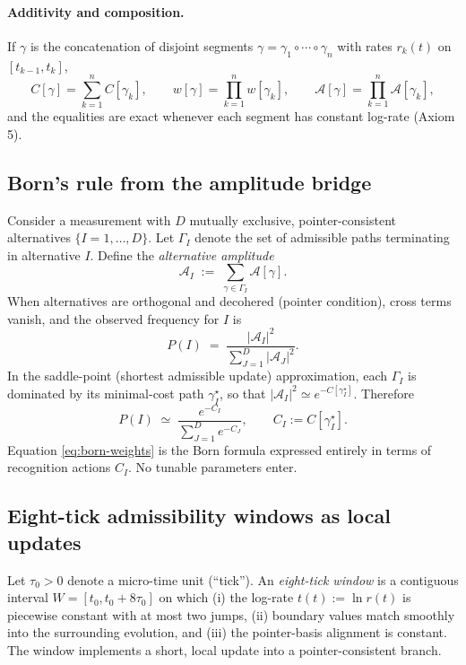 \documentclass[11pt,letterpaper]{article}
\theoremstyle{definition}
\begin{document}
\paragraph{Additivity and composition.}
If \(\gamma\) is the concatenation of disjoint segments \(\gamma=\gamma_1\circ\cdots\circ\gamma_n\) with rates \(r_k(t)\) on \([t_{k-1},t_k]\),
\begin{equation}
C[\gamma]=\sum_{k=1}^n C[\gamma_k],\qquad
w[\gamma]=\prod_{k=1}^n w[\gamma_k],\qquad
\mathcal A[\gamma]=\prod_{k=1}^n \mathcal A[\gamma_k],
\end{equation}
and the equalities are exact whenever each segment has constant log-rate (Axiom 5).

\subsection{Born's rule from the amplitude bridge}
Consider a measurement with \(D\) mutually exclusive, pointer-consistent alternatives \(\{I=1,\dots,D\}\). Let \(\Gamma_I\) denote the set of admissible paths terminating in alternative \(I\). Define the \emph{alternative amplitude}
\begin{equation}
\mathcal A_I\;:=\;\sum_{\gamma\in\Gamma_I} \mathcal A[\gamma].
\label{eq:AI-def}
\end{equation}
When alternatives are orthogonal and decohered (pointer condition), cross terms vanish, and the observed frequency for \(I\) is
\begin{equation}
P(I)\;=\;\frac{|\mathcal A_I|^2}{\sum_{J=1}^D |\mathcal A_J|^2}.
\label{eq:born-master}
\end{equation}
In the saddle-point (shortest admissible update) approximation, each \(\Gamma_I\) is dominated by its minimal-cost path \(\gamma_I^\star\), so that \(|\mathcal A_I|^2 \simeq e^{-C[\gamma_I^\star]}\). Therefore
\begin{equation}
P(I)\;\simeq\;\frac{e^{-C_I}}{\sum_{J=1}^D e^{-C_J}},
\qquad C_I:=C[\gamma_I^\star].
\label{eq:born-weights}
\end{equation}
Equation \eqref{eq:born-weights} is the Born formula expressed entirely in terms of recognition actions \(C_I\). No tunable parameters enter.

\subsection{Eight-tick admissibility windows as local updates}
Let \(\tau_0>0\) denote a micro-time unit (``tick''). An \emph{eight-tick window} is a contiguous interval \(W=[t_0,t_0+8\tau_0]\) on which (i) the log-rate \(t(t):=\ln r(t)\) is piecewise constant with at most two jumps, (ii) boundary values match smoothly into the surrounding evolution, and (iii) the pointer-basis alignment is constant. The window implements a short, local update into a pointer-consistent branch.
\end{document}
